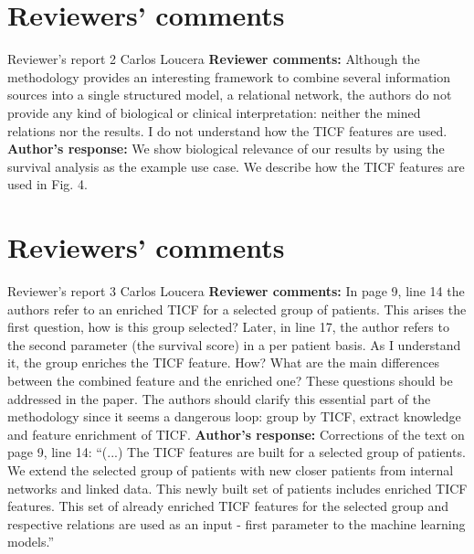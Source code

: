 \documentclass{bmcart}
\begin{document}
\begin{backmatter}
\section*{Reviewers' comments}
\newline Reviewer's report 2
\newline Carlos Loucera
\newline \textbf{Reviewer comments:}
Although the methodology provides an interesting framework to combine several information sources into a single structured model, a relational network, the authors do not provide any kind of biological or clinical interpretation: neither the mined relations nor the results. I do not understand how the TICF features are used.
\newline \textbf{Author's response:}
We show biological relevance of our results by using the survival analysis as the example use case. 
We describe how the TICF features are used in Fig. 4.


\section*{Reviewers' comments}
\newline Reviewer's report 3
\newline Carlos Loucera
\newline \textbf{Reviewer comments:}
In page 9, line 14 the authors refer to an enriched TICF for a selected group of patients. This arises the first question, how is this group selected? Later, in line 17, the author refers to the second parameter (the survival score) in a per patient basis. As I understand it, the group enriches the TICF feature. How? What are the main differences between the combined feature and the enriched one? These questions should be addressed in the paper. The authors should clarify this essential part of the methodology since it seems a dangerous loop: group by TICF, extract knowledge and feature enrichment of TICF. 
\newline \textbf{Author's response:}
Corrections of the text on page 9, line 14: “(...) The TICF features are built for a selected group of patients. We extend the selected group of patients with new closer patients from internal networks and linked data. This newly built set of patients includes enriched TICF features. This set of already enriched TICF features for the selected group and respective relations are used as an input - first parameter to the machine learning models.”


\end{backmatter}
\end{document}
